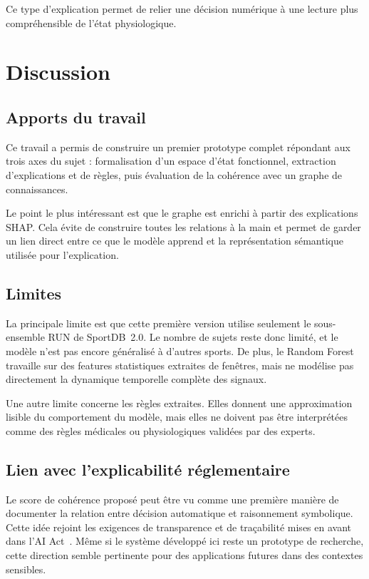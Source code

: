 \documentclass[12pt,a4paper]{article}
\begin{document}
Ce type d'explication permet de relier une décision numérique à une lecture
plus compréhensible de l'état physiologique.


\section{Discussion}
\label{sec:discussion}


\subsection{Apports du travail}

Ce travail a permis de construire un premier prototype complet répondant aux
trois axes du sujet : formalisation d'un espace d'état fonctionnel,
extraction d'explications et de règles, puis évaluation de la cohérence avec
un graphe de connaissances.

Le point le plus intéressant est que le graphe est enrichi à partir des
explications SHAP. Cela évite de construire toutes les relations à la main
et permet de garder un lien direct entre ce que le modèle apprend et la
représentation sémantique utilisée pour l'explication.

\subsection{Limites}

La principale limite est que cette première version utilise seulement le
sous-ensemble RUN de SportDB~2.0. Le nombre de sujets reste donc limité, et
le modèle n'est pas encore généralisé à d'autres sports. De plus, le Random
Forest travaille sur des features statistiques extraites de fenêtres, mais
ne modélise pas directement la dynamique temporelle complète des signaux.

Une autre limite concerne les règles extraites. Elles donnent une
approximation lisible du comportement du modèle, mais elles ne doivent pas
être interprétées comme des règles médicales ou physiologiques validées par
des experts.

\subsection{Lien avec l'explicabilité réglementaire}

Le score de cohérence proposé peut être vu comme une première manière de
documenter la relation entre décision automatique et raisonnement
symbolique. Cette idée rejoint les exigences de transparence et de
traçabilité mises en avant dans l'AI Act~\cite{aiact}. Même si le système
développé ici reste un prototype de recherche, cette direction semble
pertinente pour des applications futures dans des contextes sensibles.
\end{document}
